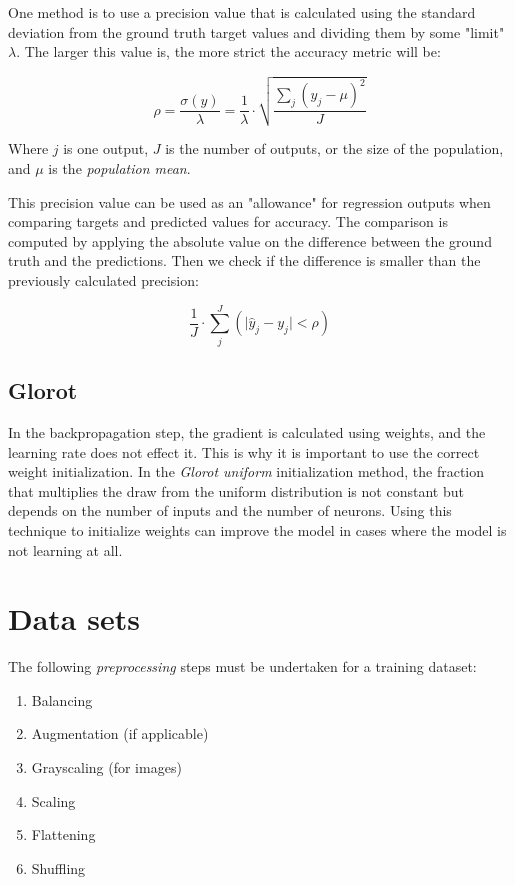 \documentclass[a4paper]{report}
\newcommand{\abs}[1]{\lvert#1\rvert}
\begin{document}
One method is to use a precision value that is calculated using the standard deviation from the ground truth target values and dividing them by some "limit" $\lambda$. The larger this value is, the more strict the accuracy metric will be:

\begin{equation*}
    \rho = \frac{\sigma(y)}{\lambda} = \frac{1}{\lambda} \cdot \sqrt{\frac{\sum_j(y_j-\mu)^2}{J}}
\end{equation*}

Where $j$ is one output, $J$ is the number of outputs, or the size of the population, and $
\mu$ is the \emph{population mean}.

This precision value can be used as an "allowance" for regression outputs when comparing targets and predicted values for accuracy. The comparison is computed by applying the absolute value on the difference between the ground truth and the predictions. Then we check if the difference is smaller than the previously calculated precision:

\begin{equation*}
    \frac{1}{J} \cdot \sum_j^J(\abs{\hat{y}_j-y_j} < \rho)
\end{equation*}

\subsection*{Glorot}
In the backpropagation step, the gradient is calculated using weights, and the learning rate does not effect it. This is why it is important to use the correct weight initialization. In the \emph{Glorot uniform} initialization method, the fraction that multiplies the draw from the uniform distribution is not constant but depends on the number of inputs and the number of neurons. Using this technique to initialize weights can improve the model in cases where the model is not learning at all.


\section{Data sets}
The following \emph{preprocessing} steps must be undertaken for a training dataset:

\begin{enumerate}
    \item Balancing
    \item Augmentation (if applicable)
    \item Grayscaling (for images)
    \item Scaling
    \item Flattening
    \item Shuffling
\end{enumerate}
\end{document}
